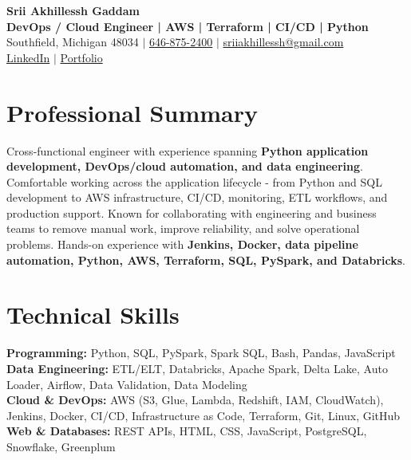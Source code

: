 \documentclass[letterpaper,10pt]{article}
\begin{document}
\fontsize{9.35pt}{10.45pt}\selectfont

\begin{center}
    {\LARGE \textbf{Srii Akhillessh Gaddam}} \\[-1pt]
    \textbf{DevOps / Cloud Engineer | AWS | Terraform | CI/CD | Python} \\[2pt]
    Southfield, Michigan 48034 $|$
    \href{tel:6468752400}{646-875-2400} $|$
    \href{mailto:sriiakhillessh@gmail.com}{sriiakhillessh@gmail.com} \\[1pt]
    \href{https://www.linkedin.com/in/srii-akhiilessh-gaddam-b48668191/}{LinkedIn} $|$
    \href{https://sriiakhillesshg.github.io/portfolio/}{Portfolio}
\end{center}
\vspace{-8pt}

\section{Professional Summary}
\small{Cross-functional engineer with experience spanning \textbf{Python application development, DevOps/cloud automation, and data engineering}. Comfortable working across the application lifecycle - from Python and SQL development to AWS infrastructure, CI/CD, monitoring, ETL workflows, and production support. Known for collaborating with engineering and business teams to remove manual work, improve reliability, and solve operational problems. Hands-on experience with \textbf{Jenkins, Docker, data pipeline automation, Python, AWS, Terraform, SQL, PySpark, and Databricks}.}

\section{Technical Skills}
\small{
\textbf{Programming:} Python, SQL, PySpark, Spark SQL, Bash, Pandas, JavaScript \\
\textbf{Data Engineering:} ETL/ELT, Databricks, Apache Spark, Delta Lake, Auto Loader, Airflow, Data Validation, Data Modeling \\
\textbf{Cloud \& DevOps:} AWS (S3, Glue, Lambda, Redshift, IAM, CloudWatch), Jenkins, Docker, CI/CD, Infrastructure as Code, Terraform, Git, Linux, GitHub \\
\textbf{Web \& Databases:} REST APIs, HTML, CSS, JavaScript, PostgreSQL, Snowflake, Greenplum
}
\end{document}
